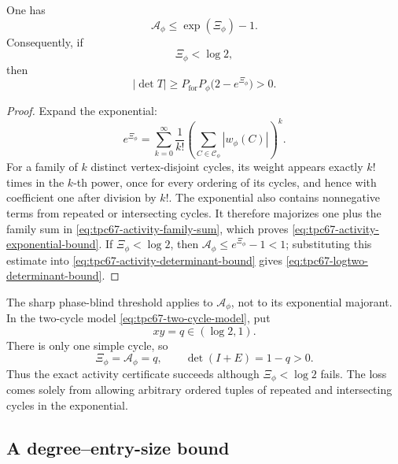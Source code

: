 \begin{theorem}
\label{thm:tpc67-exponential-activity}
One has
\begin{equation}
 \boxed{
 \mathcal A_\phi
 \le
 \exp(\Xi_\phi)-1.}
 \label{eq:tpc67-activity-exponential-bound}
\end{equation}
Consequently, if
\begin{equation}
 \Xi_\phi<\log 2,
 \label{eq:tpc67-logtwo-condition}
\end{equation}
then
\begin{equation}
 \boxed{
 |\det T|
 \ge
 P_{\mathrm{for}}P_\phi
 \bigl(2-e^{\Xi_\phi}\bigr)>0.}
 \label{eq:tpc67-logtwo-determinant-bound}
\end{equation}
\end{theorem}

\begin{proof}
Expand the exponential:
\[
 e^{\Xi_\phi}
 =
 \sum_{k=0}^{\infty}
 \frac1{k!}
 \left(
 \sum_{C\in\mathscr C_\phi}|w_\phi(C)|
 \right)^k.
\]
For a family of \(k\) distinct vertex-disjoint cycles, its weight appears
exactly \(k!\) times in the \(k\)-th power, once for every ordering of its
cycles, and hence with coefficient one after division by \(k!\).  The
exponential also contains nonnegative terms from repeated or intersecting
cycles.  It therefore majorizes one plus the family sum in
\eqref{eq:tpc67-activity-family-sum}, which proves
\eqref{eq:tpc67-activity-exponential-bound}.  If
\(\Xi_\phi<\log2\), then
\(\mathcal A_\phi\le e^{\Xi_\phi}-1<1\); substituting this estimate into
\eqref{eq:tpc67-activity-determinant-bound} gives
\eqref{eq:tpc67-logtwo-determinant-bound}.
\end{proof}

\begin{remark}
\label{rem:tpc67-logtwo-not-sharp}
The sharp phase-blind threshold applies to
\(\mathcal A_\phi\), not to its exponential majorant.  In the two-cycle
model \eqref{eq:tpc67-two-cycle-model}, put
\[
 xy=q\in(\log2,1).
\]
There is only one simple cycle, so
\[
 \Xi_\phi=\mathcal A_\phi=q,
 \qquad
 \det(I+E)=1-q>0.
\]
Thus the exact activity certificate succeeds although
\(\Xi_\phi<\log2\) fails.  The loss comes solely from allowing arbitrary
ordered tuples of repeated and intersecting cycles in the exponential.
\end{remark}

\subsection{A degree--entry-size bound}

